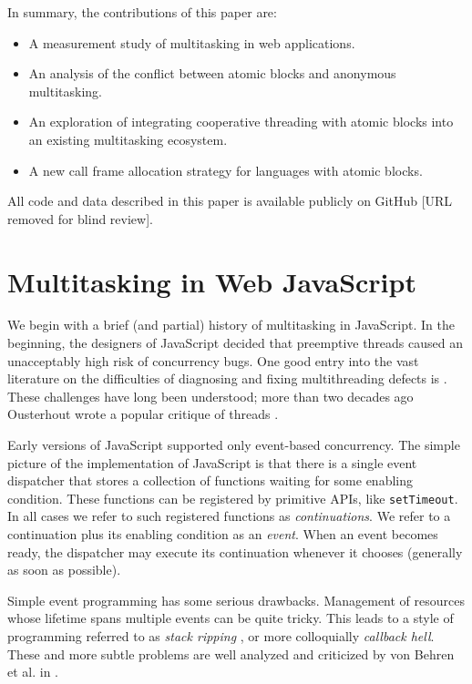 \documentclass[acmsmall,anonymous,review]{acmart}\settopmatter{printfolios=true,printccs=false,printacmref=false}
\begin{document}
In summary, the contributions of this paper are:
\begin{itemize}
\item A measurement study of multitasking in web applications.
\item An analysis of the conflict between atomic blocks and anonymous multitasking.
\item An exploration of integrating cooperative threading with atomic blocks into an existing multitasking ecosystem.
\item A new call frame allocation strategy for languages with atomic blocks.
\end{itemize}

All code and data described in this paper is available publicly on GitHub [URL removed for blind review].

\section{Multitasking in Web JavaScript}

We begin with a brief (and partial) history of multitasking in JavaScript.
In the beginning, the designers of JavaScript decided that preemptive threads caused an unacceptably high risk of concurrency bugs.
One good entry into the vast literature on the difficulties of diagnosing and fixing multithreading defects is \cite{Lu2008}.
These challenges have long been understood; more than two decades ago Ousterhout wrote a popular critique of threads \cite{Ousterhout1996}.

Early versions of JavaScript supported only event-based concurrency.
The simple picture of the implementation of JavaScript is that there is a single event dispatcher that stores a collection of functions waiting for some enabling condition.
These functions can be registered by primitive APIs, like \texttt{setTimeout}.
In all cases we refer to such registered functions as \emph{continuations}.
We refer to a continuation plus its enabling condition as an \emph{event}.
When an event becomes ready, the dispatcher may execute its continuation whenever it chooses (generally as soon as possible).

Simple event programming has some serious drawbacks.
Management of resources whose lifetime spans multiple events can be quite tricky.
This leads to a style of programming referred to as \emph{stack ripping} \cite{Adya2002}, or more colloquially \emph{callback hell}.
These and more subtle problems are well analyzed and criticized by von Behren et al. in \cite{Behren2003a}.
\end{document}
